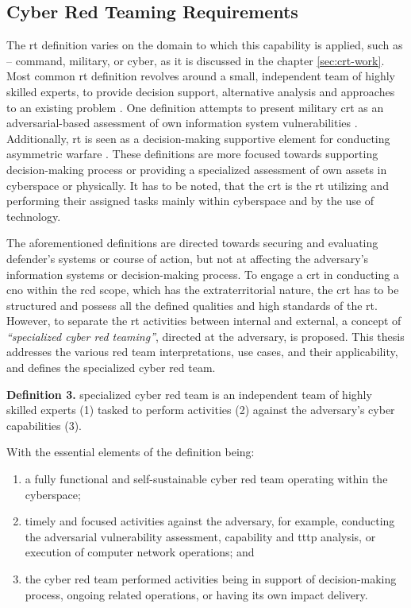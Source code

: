 \subsection{Cyber Red Teaming Requirements}
\label{sec:crt}
\glsresetall
The \gls{rt} definition varies on the domain to which this capability is applied, such as -- command, military, or cyber, as it is discussed in the chapter \ref{sec:crt-work}.
Most common \gls{rt} definition revolves around a small, independent team of highly skilled experts, to provide decision support, alternative analysis and approaches to an existing problem \cite{UK2013} \cite{USJCS2016}.
One definition attempts to present military \gls{crt} as an adversarial-based assessment of own information system vulnerabilities \cite{Brangetto2015}.
Additionally, \gls{rt} is seen as a decision-making supportive element for conducting asymmetric warfare \cite{Longbine2008}.
These definitions are more focused towards supporting decision-making process or providing a specialized assessment of own assets in cyberspace or physically.
It has to be noted, that the \gls{crt} is the \gls{rt} utilizing and performing their assigned tasks mainly within cyberspace and by the use of technology.

The aforementioned definitions are directed towards securing and evaluating defender's systems or course of action, but not at affecting the adversary's information systems or decision-making process.
To engage a \gls{crt} in conducting a \gls{cno} within the \gls{rcd} scope, which has the extraterritorial nature, the \gls{crt} has to be structured and possess all the defined qualities and high standards of the \gls{rt}. However, to separate the \gls{rt} activities between internal and external, a concept of \textit{``specialized cyber red teaming''}, directed at the adversary, is proposed.
This thesis addresses the various red team interpretations, use cases, and their applicability, and defines the specialized cyber red team.
\begin{description}
    \label{def:crt}
    \item \textbf{Definition 3.} specialized cyber red team is an independent team of highly skilled experts (1) tasked to perform activities (2) against the adversary's cyber capabilities (3).

    With the essential elements of the definition being:
    \begin{enumerate}
        \item a fully functional and self-sustainable cyber red team operating within the cyberspace;
        \item timely and focused activities against the adversary, for example, conducting the adversarial vulnerability assessment, capability and \gls{tttp} analysis, or execution of computer network operations; and
        \item the cyber red team performed activities being in support of decision-making process, ongoing related operations, or having its own impact delivery.
    \end{enumerate}
\end{description}

